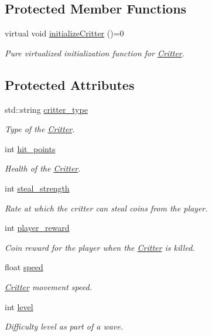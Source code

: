 \subsection*{Protected Member Functions}
\begin{DoxyCompactItemize}
\item 
virtual void \hyperlink{class_critter_ab903f6d28ef3fc70808390fef8816b79}{initialize\+Critter} ()=0
\begin{DoxyCompactList}\small\item\em Pure virtualized initialization function for \hyperlink{class_critter}{Critter}. \end{DoxyCompactList}\end{DoxyCompactItemize}
\subsection*{Protected Attributes}
\begin{DoxyCompactItemize}
\item 
std\+::string \hyperlink{class_critter_a0228568729f86823591b390f53ad5ebc}{critter\+\_\+type}
\begin{DoxyCompactList}\small\item\em Type of the \hyperlink{class_critter}{Critter}. \end{DoxyCompactList}\item 
int \hyperlink{class_critter_a916038a11e8443ea403a644e91fc791e}{hit\+\_\+points}
\begin{DoxyCompactList}\small\item\em Health of the \hyperlink{class_critter}{Critter}. \end{DoxyCompactList}\item 
int \hyperlink{class_critter_a60f7c436aec1f6a63d4fb5af57eb8eef}{steal\+\_\+strength}
\begin{DoxyCompactList}\small\item\em Rate at which the critter can steal coins from the player. \end{DoxyCompactList}\item 
int \hyperlink{class_critter_a2a17f7366fbde83714742e66ba3e63a7}{player\+\_\+reward}
\begin{DoxyCompactList}\small\item\em Coin reward for the player when the \hyperlink{class_critter}{Critter} is killed. \end{DoxyCompactList}\item 
float \hyperlink{class_critter_adde7d84a0dd9ac8f5dc144464928638f}{speed}
\begin{DoxyCompactList}\small\item\em \hyperlink{class_critter}{Critter} movement speed. \end{DoxyCompactList}\item 
int \hyperlink{class_critter_a9f9a6408a55212036f317710dc3da410}{level}
\begin{DoxyCompactList}\small\item\em Difficulty level as part of a wave. \end{DoxyCompactList}\end{DoxyCompactItemize}
